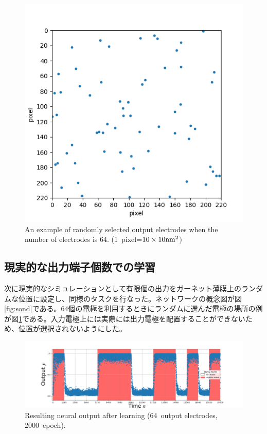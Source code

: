 \documentclass[a4j, twocolumn]{jsarticle}
\begin{document}
\begin{figure}
\centering
\includegraphics[width=1\hsize]{./figures/psp_dotplotnn64_eta30_bs128_epoch2000_20190605l_using_neurons} 
\caption{An example of randomly selected output electrodes when the number of electrodes is 64. (1~pixel=$10\times10 \rm{nm^2}$)}
\label{fig:random}
\end{figure}

\subsection{現実的な出力端子個数での学習}
\label{subsec:limited}

次に現実的なシミュレーションとして有限個の出力をガーネット薄膜上のランダムな位置に設定し、同様のタスクを行なった。ネットワークの概念図が図\ref{fig:sond}である。64個の電極を利用するときにランダムに選んだ電極の場所の例が図\ref{fig:random}である。入力電極上には実際には出力電極を配置することができないため、位置が選択されないようにした。

\begin{figure}
\centering
\includegraphics[width=1\hsize]{./figures/b128_e2000_eta30_nn64_r2.png} 
\caption{Resulting neural output after learning (64~output electrodes, 2000~epoch).}
\label{fig:result64}
\end{figure}
\end{document}
